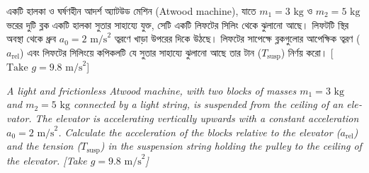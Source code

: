 \documentclass[12pt, a4paper]{article}
\begin{document}
\begin{tcolorbox}[questionbox={প্রশ্ন (Question) 13}]
\noindent
একটি হালকা ও ঘর্ষণহীন আদর্শ অ্যাটউড মেশিন (Atwood machine), যাতে $m_1 = 3\text{ kg}$ ও $m_2 = 5\text{ kg}$ ভরের দুটি ব্লক একটি হালকা সুতার সাহায্যে যুক্ত, সেটি একটি লিফটের সিলিং থেকে ঝুলানো আছে। লিফটটি স্থির অবস্থা থেকে ধ্রুব $a_0 = 2\text{ m/s}^2$ ত্বরণে খাড়া উপরের দিকে উঠছে। লিফটের সাপেক্ষে ব্লকগুলোর আপেক্ষিক ত্বরণ ($a_{\text{rel}}$) এবং লিফটের সিলিংয়ে কপিকলটি যে সুতার সাহায্যে ঝুলানো আছে তার টান ($T_{\text{susp}}$) নির্ণয় করো। [$\text{Take } g = 9.8\text{ m/s}^2$]

\vspace{0.8em}
\begin{english}
\noindent\textit{\color{darkgray}
A light and frictionless Atwood machine, with two blocks of masses $m_1 = 3\text{ kg}$ and $m_2 = 5\text{ kg}$ connected by a light string, is suspended from the ceiling of an elevator. The elevator is accelerating vertically upwards with a constant acceleration $a_0 = 2\text{ m/s}^2$. Calculate the acceleration of the blocks relative to the elevator ($a_{\text{rel}}$) and the tension ($T_{\text{susp}}$) in the suspension string holding the pulley to the ceiling of the elevator. [Take $g = 9.8\text{ m/s}^2$]
}
\end{english}
\end{tcolorbox}
\end{document}
